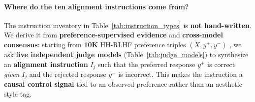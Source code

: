 \paragraph{Where do the ten alignment instructions come from?}
The instruction inventory in Table~\ref{tab:instruction_types} is \textbf{not hand-written}.
We derive it from \textbf{preference-supervised evidence} and \textbf{cross-model consensus}:
starting from \textbf{10K} HH-RLHF preference triples $(X,y^+,y^-)$ \cite{bai2022hh},
we ask \textbf{five independent judge models} (Table~\ref{tab:judge_models})
to synthesize an \textbf{alignment instruction} $I_j$ such that the preferred response $y^+$ is correct \emph{given} $I_j$ and the rejected response $y^-$ is incorrect.
This makes the instruction a \textbf{causal control signal} tied to an observed preference rather than an aesthetic style tag.



\vspace{-0.35em}
\begin{table}[h!]
\centering
\small
\setlength{\tabcolsep}{6pt}
\renewcommand{\arraystretch}{1.05}
\vspace{-0.45em}
\caption{\textbf{Judge models for instruction synthesis.}
Five independent LLM judges propose alignment instructions for the same preference pair; we keep only cases with \textbf{cross-judge semantic agreement} (Section~\ref{sec:ecliptica_benchmark}).}
\label{tab:judge_models}
\vspace{-1.5em}
\end{table}





